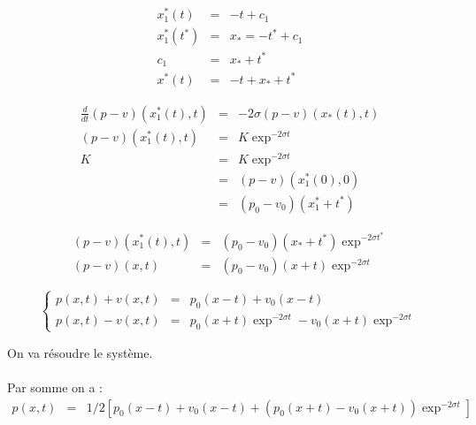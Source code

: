 \documentclass[a4paper,11pt]{article}
\begin{document}
\begin{equation*}
\begin{array}{rcl}
    x_{1}^{*}(t) &=& -t +c_{1} \\
    x_{1}^{*}(t^{*}) &=& x_{*} = -t^{*}+c_{1} \\
    c_{1} &=& x_{*} + t^{*} \\
    x^{*}(t) &=& -t + x_{*} + t^{*}
\end{array}
\end{equation*}

\begin{equation*}
\begin{array}{rcl}
    \frac{d}{dt}(p-v)(x_{1}^{*}(t), t) &=& -2\sigma (p-v)(x_{*}(t), t) \\
    (p-v)(x_{1}^{*}(t), t) &=& K \exp^{-2\sigma t} \\
    K &=& K \exp^{-2\sigma t} \\
    &=& (p-v)(x_{1}^{*}(0), 0) \\
    &=& (p_{0}-v_{0})(x_{1}^{*} + t^{*})
\end{array}
\end{equation*}

\begin{equation*}
\begin{array}{rcl}
    (p-v)(x_{1}^{*}(t), t) &=& (p_{0}-v_{0})(x_{*} + t^{*})\exp^{-2\sigma t^{*}} \\
    (p-v)(x,t) &=& (p_{0}-v_{0})(x+t)\exp^{-2\sigma t}
\end{array}
\end{equation*}

\begin{equation*}
\left\{
\begin{array}{rcl}
    p(x, t) + v(x, t) &=& p_{0}(x - t) + v_{0}(x - t) \\
    p(x, t) - v(x, t) &=& p_{0}(x + t) \exp^{-2\sigma t} - v_{0}(x + t) \exp^{-2\sigma t}
\end{array}
\right.
\end{equation*}

On va résoudre le système. \\ \\
Par somme on a :
\begin{equation*}
\begin{array}{rcll}
    p(x,t) &=& 1/2\left[p_{0}(x - t) + v_{0}(x - t) + (p_{0}(x + t) - v_{0}(x + t))\exp^{-2\sigma t} \right] &
\end{array}
\end{equation*}
\end{document}
